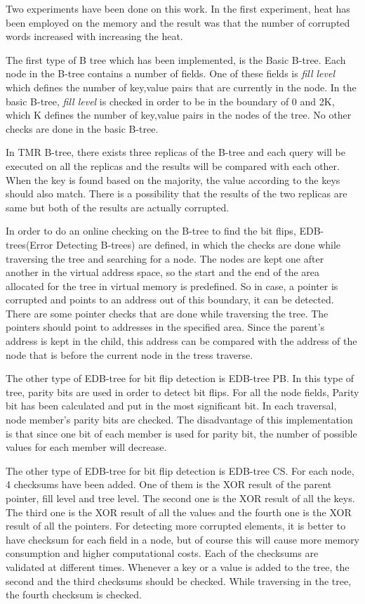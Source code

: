 \documentclass{report}
\begin{document}
Two experiments have been done on this work. In the first experiment, heat has been employed on the memory and the result was that the number of corrupted words increased with increasing the heat.

The first type of B tree which has been implemented, is the Basic B-tree. Each node in the B-tree contains a number of fields. One of these fields is \textit {fill level} which defines the number of key,value pairs that are currently in the node. In the basic B-tree, \textit {fill level} is checked in order to be in the boundary of 0 and 2K, which K defines the number of key,value pairs in the nodes of the tree. No other checks are done in the basic B-tree.

In TMR B-tree, there exists three replicas of the B-tree and each query will be executed on all the replicas and the results will be compared with each other. When the key is found based on the majority, the value according to the keys should also match. There is a possibility that the results of the two replicas are same but both of the results are actually corrupted.

In order to do an online checking on the B-tree to find the bit flips, EDB-trees(Error Detecting B-trees) are defined, in which the checks are done while traversing the tree and searching for a node. The nodes are kept one after another in the virtual address space, so the start and the end of the area allocated for the tree in virtual memory is predefined. So in case, a pointer is corrupted and points to an address out of this boundary, it can be detected. There are some pointer checks that are done while traversing the tree. The pointers should point to addresses in the specified area. Since the parent's address is kept in the child, this address can be compared with the address of the node that is before the current node in the tress traverse.

The other type of EDB-tree for bit flip detection is EDB-tree PB. In this type of tree, parity bits are used in order to detect bit flips. For all the node fields, Parity bit has been calculated and put in the most significant bit. In each traversal, node member's parity bits are checked. The disadvantage of this implementation is that since one bit of each member is used for parity bit, the number of possible values for each member will decrease.

The other type of EDB-tree for bit flip detection is EDB-tree CS. For each node, 4 checksums have been added. One of them is the XOR result of the parent pointer, fill level and tree level. The second one is the XOR result of all the keys. The third one is the XOR result of all the values and the fourth one is the XOR result of all the pointers. For detecting more corrupted elements, it is better to have checksum for each field in a node, but of course this will cause more memory consumption and higher computational costs. Each of the checksums are validated at different times. Whenever a key or a value is added to the tree, the second and the third checksums should be checked. While traversing in the tree, the fourth checksum is checked.
\end{document}
